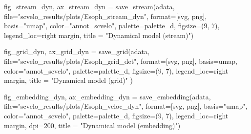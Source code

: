 \documentclass[
  letterpaper,
  DIV=11,
  numbers=noendperiod]{scrreprt}
\newenvironment{Shaded}{\begin{snugshade}}{\end{snugshade}}
\newcommand{\BuiltInTok}[1]{\textcolor[rgb]{0.00,0.23,0.31}{#1}}
\newcommand{\DecValTok}[1]{\textcolor[rgb]{0.68,0.00,0.00}{#1}}
\newcommand{\NormalTok}[1]{\textcolor[rgb]{0.00,0.23,0.31}{#1}}
\newcommand{\OperatorTok}[1]{\textcolor[rgb]{0.37,0.37,0.37}{#1}}
\newcommand{\StringTok}[1]{\textcolor[rgb]{0.13,0.47,0.30}{#1}}
\begin{document}
\begin{Shaded}
\begin{Highlighting}[]
\NormalTok{fig\_stream\_dyn, ax\_stream\_dyn }\OperatorTok{=}\NormalTok{ save\_stream(adata, }\BuiltInTok{file}\OperatorTok{=}\StringTok{"scvelo\_results/plots/Esoph\_stream\_dyn"}\NormalTok{, }\BuiltInTok{format}\OperatorTok{=}\NormalTok{[}\StringTok{\textquotesingle{}svg\textquotesingle{}}\NormalTok{, }\StringTok{\textquotesingle{}png\textquotesingle{}}\NormalTok{], basis}\OperatorTok{=}\StringTok{"umap"}\NormalTok{, color}\OperatorTok{=}\StringTok{"annot\_scvelo"}\NormalTok{, palette}\OperatorTok{=}\NormalTok{palette\_d, figsize}\OperatorTok{=}\NormalTok{(}\DecValTok{9}\NormalTok{, }\DecValTok{7}\NormalTok{), legend\_loc}\OperatorTok{=}\StringTok{\textquotesingle{}right margin\textquotesingle{}}\NormalTok{, title }\OperatorTok{=} \StringTok{"Dynamical model (stream)"}\NormalTok{)}

\NormalTok{fig\_grid\_dyn, ax\_grid\_dyn }\OperatorTok{=}\NormalTok{ save\_grid(adata, }\BuiltInTok{file}\OperatorTok{=}\StringTok{"scvelo\_results/plots/Esoph\_grid\_det"}\NormalTok{, }\BuiltInTok{format}\OperatorTok{=}\NormalTok{[}\StringTok{\textquotesingle{}svg\textquotesingle{}}\NormalTok{, }\StringTok{\textquotesingle{}png\textquotesingle{}}\NormalTok{], basis}\OperatorTok{=}\StringTok{\textquotesingle{}umap\textquotesingle{}}\NormalTok{, color}\OperatorTok{=}\StringTok{"annot\_scvelo"}\NormalTok{, palette}\OperatorTok{=}\NormalTok{palette\_d, figsize}\OperatorTok{=}\NormalTok{(}\DecValTok{9}\NormalTok{, }\DecValTok{7}\NormalTok{), legend\_loc}\OperatorTok{=}\StringTok{\textquotesingle{}right margin\textquotesingle{}}\NormalTok{, title }\OperatorTok{=} \StringTok{"Dynamical model (grid)"}\NormalTok{ )}

\NormalTok{fig\_embedding\_dyn, ax\_embedding\_dyn }\OperatorTok{=}\NormalTok{ save\_embedding(adata, }\BuiltInTok{file}\OperatorTok{=}\StringTok{"scvelo\_results/plots/Esoph\_veloc\_dyn"}\NormalTok{, }\BuiltInTok{format}\OperatorTok{=}\NormalTok{[}\StringTok{\textquotesingle{}svg\textquotesingle{}}\NormalTok{, }\StringTok{\textquotesingle{}png\textquotesingle{}}\NormalTok{], basis}\OperatorTok{=}\StringTok{"umap"}\NormalTok{, color}\OperatorTok{=}\StringTok{"annot\_scvelo"}\NormalTok{, palette}\OperatorTok{=}\NormalTok{palette\_d, figsize}\OperatorTok{=}\NormalTok{(}\DecValTok{9}\NormalTok{, }\DecValTok{7}\NormalTok{), legend\_loc}\OperatorTok{=}\StringTok{\textquotesingle{}right margin\textquotesingle{}}\NormalTok{, dpi}\OperatorTok{=}\DecValTok{200}\NormalTok{, title }\OperatorTok{=} \StringTok{"Dynamical model (embedding)"}\NormalTok{)}
\end{Highlighting}
\end{Shaded}
\end{document}
